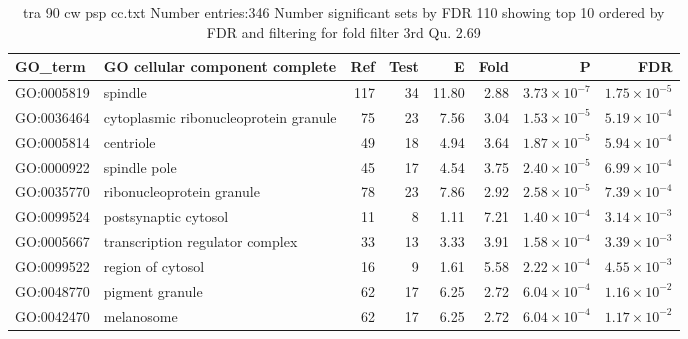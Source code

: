 \begin{table}[ht]
\centering
\begin{adjustbox}{width=\textwidth}
\begin{tabular}{llrrrrrr}
  \hline
GO\_term & GO cellular component complete & Ref & Test & E & Fold & P & FDR \\ 
  \hline
GO:0005819 & spindle  & 117 & 34 & 11.80 & 2.88 & $3.73 \times 10^{-7}$ & $1.75 \times 10^{-5}$ \\ 
  GO:0036464 & cytoplasmic ribonucleoprotein granule  & 75 & 23 & 7.56 & 3.04 & $1.53 \times 10^{-5}$ & $5.19 \times 10^{-4}$ \\ 
  GO:0005814 & centriole  & 49 & 18 & 4.94 & 3.64 & $1.87 \times 10^{-5}$ & $5.94 \times 10^{-4}$ \\ 
  GO:0000922 & spindle pole  & 45 & 17 & 4.54 & 3.75 & $2.40 \times 10^{-5}$ & $6.99 \times 10^{-4}$ \\ 
  GO:0035770 & ribonucleoprotein granule  & 78 & 23 & 7.86 & 2.92 & $2.58 \times 10^{-5}$ & $7.39 \times 10^{-4}$ \\ 
  GO:0099524 & postsynaptic cytosol  & 11 & 8 & 1.11 & 7.21 & $1.40 \times 10^{-4}$ & $3.14 \times 10^{-3}$ \\ 
  GO:0005667 & transcription regulator complex  & 33 & 13 & 3.33 & 3.91 & $1.58 \times 10^{-4}$ & $3.39 \times 10^{-3}$ \\ 
  GO:0099522 & region of cytosol  & 16 & 9 & 1.61 & 5.58 & $2.22 \times 10^{-4}$ & $4.55 \times 10^{-3}$ \\ 
  GO:0048770 & pigment granule  & 62 & 17 & 6.25 & 2.72 & $6.04 \times 10^{-4}$ & $1.16 \times 10^{-2}$ \\ 
  GO:0042470 & melanosome  & 62 & 17 & 6.25 & 2.72 & $6.04 \times 10^{-4}$ & $1.17 \times 10^{-2}$ \\ 
  \hline
\end{tabular}
\end{adjustbox}
\caption{tra 90 cw psp cc.txt Number entries:346 Number significant sets by FDR 110 showing top 10 ordered by FDR and filtering for fold filter 3rd Qu. 2.69} 
\label{tab:tra 90 cw psp cc.txt Number entries:346 Number significant sets by FDR 110 showing top 10 ordered by FDR and filtering for fold filter 3rd Qu. 2.69}
\end{table}






